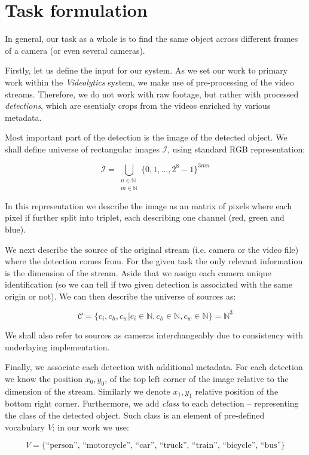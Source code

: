 \section{Task formulation}

In general, our task as a whole is to find the same object across different frames of a camera
(or even several cameras).

Firstly, let us define the input for our system. As we set our work to primary work within the \emph{Videolytics} system, we make use of pre-processing of the video streams. Therefore, we do
not work with raw footage, but rather with processed \emph{detections}, which are esentialy
crops from the videos enriched by various metadata.

Most important part of the detection is the image of the detected object. We shall define
universe of rectangular images $\mathcal{I}$, using standard RGB representation:

$$\mathcal{I} = \bigcup_{\substack{n \in \mathbb{N} \\ m \in \mathbb{N}}} \{0, 1, \ldots, 2^8-1\}^{3mn}$$

In this representation we describe the image as an matrix of pixels where each pixel
if further split into triplet, each describing one channel (red, green and blue).

We next describe the source of the original stream (i.e. camera or the video file)
where the detection comes from. For the given task the only relevant information
is the dimension of the stream. Aside that we assign each camera unique identification
(so we can tell if two given detection is associated with the same origin or not).
We can then describe the universe of sources as:

$$\mathcal{C} = \{c_i, c_h, c_w | c_i \in \mathbb{N}, c_h \in \mathbb{N}, c_w \in \mathbb{N}\}
 = \mathbb{N}^3$$
 
We shall also refer to sources as cameras interchangeably due to consistency with
underlaying implementation.

Finally, we associate each detection with additional metadata. For each detection
we know the position $x_0, y_0$, of the top left corner of the image relative to
the dimension of the stream. Similarly we denote $x_1, y_1$ relative position
of the bottom right corner. Furthermore, we add \emph{class} to each detection
-- representing the class of the detected object. Such class is an element of
pre-defined vocabulary $V$; in our work we use:

$$V = \{\text{``person'', ``motorcycle'', ``car'', ``truck'', ``train'', ``bicycle'', ``bus''\}}$$

